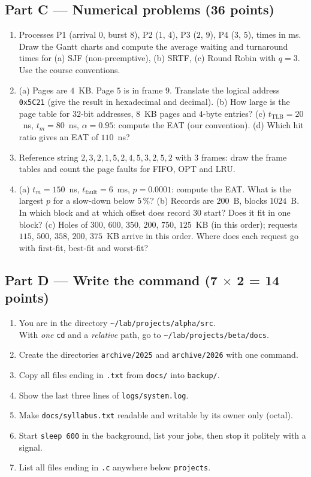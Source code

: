 \documentclass[11pt,a4paper]{article}
\newcommand{\cmd}[1]{\texttt{#1}}
\begin{document}
\subsection*{Part C --- Numerical problems (36 points)}
\begin{enumerate}[leftmargin=1.6em,label=C\arabic*.]
  \item Processes P1 (arrival $0$, burst $8$), P2 ($1$, $4$), P3 ($2$, $9$), P4 ($3$, $5$), times in ms. Draw the Gantt charts and compute the average waiting and turnaround times for (a) SJF (non-preemptive), (b) SRTF, (c) Round Robin with $q = 3$. Use the course conventions. 
  \item (a) Pages are $4$~KB. Page $5$ is in frame $9$. Translate the logical address \texttt{0x5C21} (give the result in hexadecimal and decimal). (b) How large is the page table for $32$-bit addresses, $8$~KB pages and $4$-byte entries? (c) $t_{\text{TLB}} = 20$~ns, $t_m = 80$~ns, $\alpha = 0.95$: compute the EAT (our convention). (d) Which hit ratio gives an EAT of $110$~ns? 
  \item Reference string $2, 3, 2, 1, 5, 2, 4, 5, 3, 2, 5, 2$ with $3$ frames: draw the frame tables and count the page faults for FIFO, OPT and LRU. 
  \item (a) $t_m = 150$~ns, $t_{\text{fault}} = 6$~ms, $p = 0.0001$: compute the EAT. What is the largest $p$ for a slow-down below $5\,\%$? (b) Records are $200$~B, blocks $1024$~B. In which block and at which offset does record $30$ start? Does it fit in one block? (c) Holes of $300$, $600$, $350$, $200$, $750$, $125$~KB (in this order); requests $115$, $500$, $358$, $200$, $375$~KB arrive in this order. Where does each request go with first-fit, best-fit and worst-fit? 
\end{enumerate}

\subsection*{Part D --- Write the command (7 $\times$ 2 = 14 points)}
\begin{enumerate}[leftmargin=1.6em,label=D\arabic*.]
  \item You are in the directory \texttt{\textasciitilde/lab/projects/alpha/src}.\\ With \emph{one} \cmd{cd} and a \emph{relative} path, go to \texttt{\textasciitilde/lab/projects/beta/docs}.
  \item Create the directories \texttt{archive/2025} and \texttt{archive/2026} with one command.
  \item Copy all files ending in \texttt{.txt} from \texttt{docs/} into \texttt{backup/}.
  \item Show the last three lines of \texttt{logs/system.log}.
  \item Make \texttt{docs/syllabus.txt} readable and writable by its owner only (octal).
  \item Start \texttt{sleep 600} in the background, list your jobs, then stop it politely with a signal.
  \item List all files ending in \texttt{.c} anywhere below \texttt{projects}.
\end{enumerate}
\end{document}
